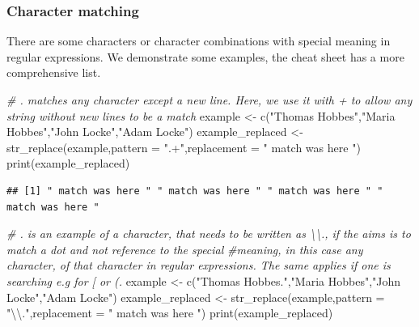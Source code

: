 \documentclass[
]{book}
\newenvironment{Shaded}{\begin{snugshade}}{\end{snugshade}}
\newcommand{\AttributeTok}[1]{\textcolor[rgb]{0.77,0.63,0.00}{#1}}
\newcommand{\CommentTok}[1]{\textcolor[rgb]{0.56,0.35,0.01}{\textit{#1}}}
\newcommand{\FunctionTok}[1]{\textcolor[rgb]{0.00,0.00,0.00}{#1}}
\newcommand{\NormalTok}[1]{#1}
\newcommand{\OtherTok}[1]{\textcolor[rgb]{0.56,0.35,0.01}{#1}}
\newcommand{\SpecialCharTok}[1]{\textcolor[rgb]{0.00,0.00,0.00}{#1}}
\newcommand{\StringTok}[1]{\textcolor[rgb]{0.31,0.60,0.02}{#1}}
\begin{document}
\hypertarget{character-matching}{%
\subsubsection{Character matching}\label{character-matching}}

There are some characters or character combinations with special meaning in regular expressions. We demonstrate some examples,
the cheat sheet has a more comprehensive list.

\begin{Shaded}
\begin{Highlighting}[]
\CommentTok{\# . matches any character except a new line. Here, we use it with + to allow any string without new lines to be a match}
\NormalTok{example }\OtherTok{\textless{}{-}} \FunctionTok{c}\NormalTok{(}\StringTok{"Thomas Hobbes"}\NormalTok{,}\StringTok{"Maria Hobbes"}\NormalTok{,}\StringTok{"John Locke"}\NormalTok{,}\StringTok{"Adam Locke"}\NormalTok{)}
\NormalTok{example\_replaced }\OtherTok{\textless{}{-}} \FunctionTok{str\_replace}\NormalTok{(example,}\AttributeTok{pattern =} \StringTok{".+"}\NormalTok{,}\AttributeTok{replacement =} \StringTok{" match was here "}\NormalTok{)}
\FunctionTok{print}\NormalTok{(example\_replaced)}
\end{Highlighting}
\end{Shaded}

\begin{verbatim}
## [1] " match was here " " match was here " " match was here " " match was here "
\end{verbatim}

\begin{Shaded}
\begin{Highlighting}[]
\CommentTok{\# . is an example of a character, that needs to be written as \textbackslash{}\textbackslash{}., if the aims is to match a dot and not reference to the special}
\CommentTok{\#meaning, in this case any character, of that character in regular expressions. The same applies if one is searching e.g for [ or (.}
\NormalTok{example }\OtherTok{\textless{}{-}} \FunctionTok{c}\NormalTok{(}\StringTok{"Thomas Hobbes."}\NormalTok{,}\StringTok{"Maria Hobbes"}\NormalTok{,}\StringTok{"John Locke"}\NormalTok{,}\StringTok{"Adam Locke"}\NormalTok{)}
\NormalTok{example\_replaced }\OtherTok{\textless{}{-}} \FunctionTok{str\_replace}\NormalTok{(example,}\AttributeTok{pattern =} \StringTok{"}\SpecialCharTok{\textbackslash{}\textbackslash{}}\StringTok{."}\NormalTok{,}\AttributeTok{replacement =} \StringTok{" match was here "}\NormalTok{)}
\FunctionTok{print}\NormalTok{(example\_replaced)}
\end{Highlighting}
\end{Shaded}
\end{document}

